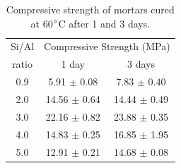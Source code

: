 \begin{table}[H]
  \centering
  \caption{Compressive strength of mortars cured at 60$^{\circ}$C after 1 and 3 days.}
  \label{tab:compressive_strength_combined}
  \begin{tabular}{ccc}
  \hline
  {Si/Al} & \multicolumn{2}{c}{Compressive Strength (MPa)} \\
  \cline{2-3}
  ratio & 1 day & 3 days \\
  \hline
  0.9 & 5.91 $\pm$ 0.08 & 7.83 $\pm$ 0.40 \\
  2.0 & 14.56 $\pm$ 0.64 & 14.44 $\pm$ 0.49 \\
  3.0 & 22.16 $\pm$ 0.82 & 23.88 $\pm$ 0.35 \\
  4.0 & 14.83 $\pm$ 0.25 & 16.85 $\pm$ 1.95 \\
  5.0 & 12.91 $\pm$ 0.21 & 14.68 $\pm$ 0.08 \\
  \hline
  \end{tabular}
\end{table}


